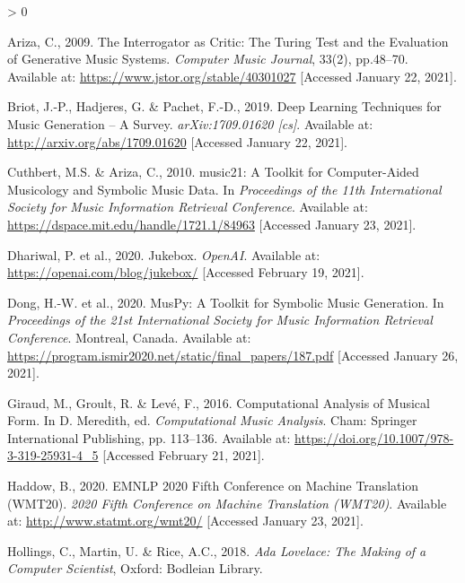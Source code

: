 \documentclass[12pt,a4paper,]{report}
\newlength{\cslhangindent}
\newenvironment{CSLReferences}[2] %
 {%
  \setlength{\parindent}{0pt}
  \ifodd #1 \everypar{\setlength{\hangindent}{\cslhangindent}}\ignorespaces\fi
  \ifnum #2 > 0
  \setlength{\parskip}{#2\baselineskip}
  \fi
 }%
 {}
\begin{document}
\hypertarget{refs}{}
\begin{CSLReferences}{1}{0}
\leavevmode\hypertarget{ref-ariza_interrogator_2009}{}%
Ariza, C., 2009. The {Interrogator} as {Critic}: {The} {Turing} {Test}
and the {Evaluation} of {Generative} {Music} {Systems}. \emph{Computer
Music Journal}, 33(2), pp.48--70. Available at:
\url{https://www.jstor.org/stable/40301027} {[}Accessed January 22,
2021{]}.

\leavevmode\hypertarget{ref-briot_deep_2019}{}%
Briot, J.-P., Hadjeres, G. \& Pachet, F.-D., 2019. Deep {Learning}
{Techniques} for {Music} {Generation} -- {A} {Survey}.
\emph{arXiv:1709.01620 {[}cs{]}}. Available at:
\url{http://arxiv.org/abs/1709.01620} {[}Accessed January 22, 2021{]}.

\leavevmode\hypertarget{ref-cuthbert_music21_2010}{}%
Cuthbert, M.S. \& Ariza, C., 2010. music21: {A} {Toolkit} for
{Computer}-{Aided} {Musicology} and {Symbolic} {Music} {Data}. In
\emph{Proceedings of the 11th {International} {Society} for {Music}
{Information} {Retrieval} {Conference}}. Available at:
\url{https://dspace.mit.edu/handle/1721.1/84963} {[}Accessed January 23,
2021{]}.

\leavevmode\hypertarget{ref-dhariwal_jukebox_2020}{}%
Dhariwal, P. et al., 2020. Jukebox. \emph{OpenAI}. Available at:
\url{https://openai.com/blog/jukebox/} {[}Accessed February 19, 2021{]}.

\leavevmode\hypertarget{ref-dong_muspy_2020}{}%
Dong, H.-W. et al., 2020. {MusPy}: {A} {Toolkit} for {Symbolic} {Music}
{Generation}. In \emph{Proceedings of the 21st {International} {Society}
for {Music} {Information} {Retrieval} {Conference}}. Montreal, Canada.
Available at:
\url{https://program.ismir2020.net/static/final_papers/187.pdf}
{[}Accessed January 26, 2021{]}.

\leavevmode\hypertarget{ref-giraud_computational_2016}{}%
Giraud, M., Groult, R. \& Levé, F., 2016. Computational {Analysis} of
{Musical} {Form}. In D. Meredith, ed. \emph{Computational {Music}
{Analysis}}. Cham: Springer International Publishing, pp. 113--136.
Available at: \url{https://doi.org/10.1007/978-3-319-25931-4_5}
{[}Accessed February 21, 2021{]}.

\leavevmode\hypertarget{ref-haddow_wmt_2020}{}%
Haddow, B., 2020. {EMNLP} 2020 {Fifth} {Conference} on {Machine}
{Translation} ({WMT20}). \emph{2020 Fifth Conference on Machine
Translation (WMT20)}. Available at: \url{http://www.statmt.org/wmt20/}
{[}Accessed January 23, 2021{]}.

\leavevmode\hypertarget{ref-hollings_ada_2018}{}%
Hollings, C., Martin, U. \& Rice, A.C., 2018. \emph{Ada {Lovelace}:
{The} {Making} of a {Computer} {Scientist}}, Oxford: Bodleian Library.


\end{CSLReferences}
\end{document}

